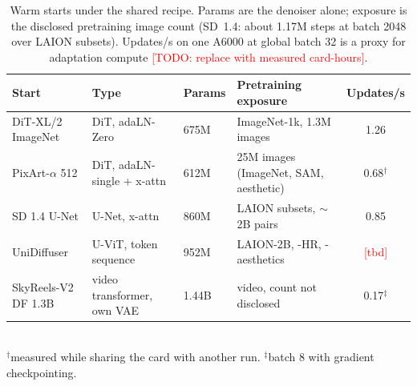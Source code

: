 \documentclass[10pt]{article}
\newcommand{\todo}[1]{\textcolor{red}{[TODO: #1]}}
\newcommand{\tbd}{\textcolor{red}{[tbd]}}  %
\begin{document}
\begin{table}[t]\centering\footnotesize
\caption{Warm starts under the shared recipe. Params are the denoiser alone; exposure is the disclosed pretraining image count (SD~1.4: about 1.17M steps at batch 2048 over LAION subsets). Updates/s on one A6000 at global batch 32 is a proxy for adaptation compute \todo{replace with measured card-hours}.}\label{tab:starts}
\begin{tabular}{llllc}\toprule
Start & Type & Params & Pretraining exposure & Updates/s \\\midrule
DiT-XL/2 ImageNet & DiT, adaLN-Zero & 675M & ImageNet-1k, 1.3M images & 1.26 \\
PixArt-$\alpha$ 512 & DiT, adaLN-single + x-attn & 612M & 25M images (ImageNet, SAM, aesthetic) & 0.68$^\dagger$ \\
SD 1.4 U-Net & U-Net, x-attn & 860M & LAION subsets, $\sim$2B pairs & 0.85 \\
UniDiffuser & U-ViT, token sequence & 952M & LAION-2B, -HR, -aesthetics & \tbd \\
SkyReels-V2 DF 1.3B & video transformer, own VAE & 1.44B & video, count not disclosed & 0.17$^\ddagger$ \\\bottomrule
\end{tabular}\\[2pt]
{\footnotesize $^\dagger$measured while sharing the card with another run. $^\ddagger$batch 8 with gradient checkpointing.}
\end{table}
\end{document}
